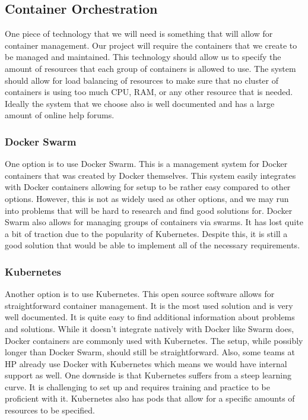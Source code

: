 \documentclass[onecolumn, draftclsnofoot,10pt, compsoc]{IEEEtran}
\begin{document}
\subsection{Container Orchestration}

One piece of technology that we will need is something that will allow for container management. Our project will require the containers that we create to be managed and maintained. This technology should allow us to specify the amount of resources that each group of containers is allowed to use. The system should allow for load balancing of resources to make sure that no cluster of containers is using too much CPU, RAM, or any other resource that is needed. Ideally the system that we choose also is well documented and has a large amount of online help forums. 

\subsubsection{Docker Swarm}
One option is to use Docker Swarm. This is a management system for Docker containers that was created by Docker themselves. This system easily integrates with Docker containers allowing for setup to be rather easy compared to other options. However, this is not as widely used as other options, and we may run into problems that will be hard to research and find good solutions for. Docker Swarm also allows for managing groups of containers via swarms.\cite{d_swarm} It has lost quite a bit of traction due to the popularity of Kubernetes. Despite this, it is still a good solution that would be able to implement all of the necessary requirements. \cite{kub_daniel_tech}

\subsubsection{Kubernetes}
Another option is to use Kubernetes. This open source software allows for straightforward container management. It is the most used solution and is very well documented. It is quite easy to find additional information about problems and solutions. While it doesn't integrate natively with Docker like Swarm does, Docker containers are commonly used with Kubernetes. The setup, while possibly longer than Docker Swarm, should still be straightforward. Also, some teams at HP already use Docker with Kubernetes which means we would have internal support as well. One downside is that Kubernetes suffers from a steep learning curve. It is challenging to set up and requires training and practice to be proficient with it.\cite{kub_daniel_tech} Kubernetes also has pods that allow for a specific amounts of resources to be specified.\cite{kub2}
\end{document}
